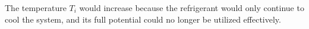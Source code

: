 The temperature \( T_i \) would increase because the refrigerant would only continue to cool the system, and its full potential could no longer be utilized effectively.